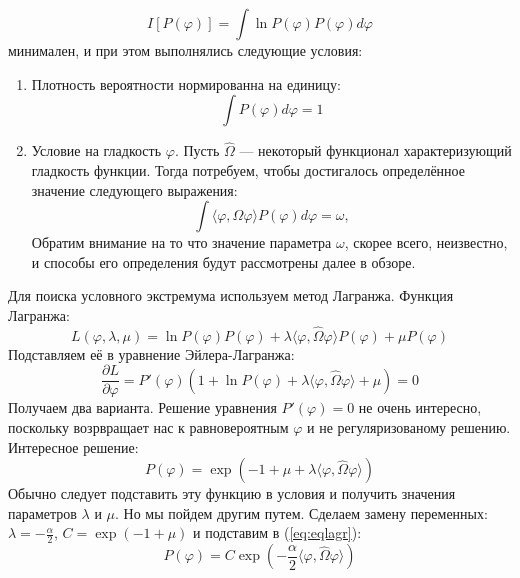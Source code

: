 \begin{equation}
\label{eq:inforamation}
I[P(\varphi)] = \int \ln{P(\varphi)} P(\varphi) d\varphi
\end{equation}
минимален, и при этом выполнялись следующие условия:
\begin{enumerate}
    \item Плотность вероятности нормированна на единицу:
    \begin{equation}
    \int P(\varphi) d\varphi = 1
    \end{equation}
    
    \item Условие на гладкость $\varphi$. Пусть $\hat{\Omega}$ --- некоторый функционал характеризующий гладкость функции. Тогда потребуем, чтобы достигалось определённое значение следующего выражения:
    \begin{equation}
    \label{eq:glad}
    \int \langle \varphi,\hat{\Omega}\varphi \rangle P(\varphi) d\varphi = \omega,
    \end{equation}
    Обратим внимание на то что значение параметра $\omega$, скорее всего, неизвестно, и способы его определения будут рассмотрены далее в обзоре.
\end{enumerate}
Для поиска условного экстремума используем метод Лагранжа. Функция Лагранжа:
\begin{equation}
L(\varphi, \lambda, \mu) = \ln{P(\varphi)} P(\varphi) + \lambda \langle \varphi,\hat{\Omega}\varphi \rangle P(\varphi) + \mu P(\varphi)
\end{equation}
Подставляем её в уравнение Эйлера-Лагранжа:
\begin{equation}
\frac{\partial L}{\partial \varphi} = P'({\varphi})(1 + \ln{P({\varphi})}  + \lambda \langle \varphi,\hat{\Omega}\varphi \rangle + \mu ) = 0
\end{equation}
Получаем два варианта. Решение уравнения $P'({\varphi}) = 0$ не очень интересно, поскольку возрвращает нас к равновероятным ${\varphi}$ и не регуляризованому решению.
Интересное решение:
\begin{equation}
P({\varphi}) = \exp(-1 + \mu + \lambda \langle \varphi,\hat{\Omega}\varphi \rangle)
\label{eq:eqlagr}
\end{equation}
Обычно следует подставить эту функцию в условия и получить значения параметров $\lambda$ и $\mu$. Но мы пойдем другим путем. Сделаем замену переменных: $\lambda = -\frac{\alpha}{2}$, $ C=\exp(-1 + \mu)$ и подставим в (\ref{eq:eqlagr}):
\begin{equation}
P({\varphi}) = C\exp(-\frac{\alpha}{2} \langle \varphi,\hat{\Omega}\varphi \rangle)
\end{equation}
